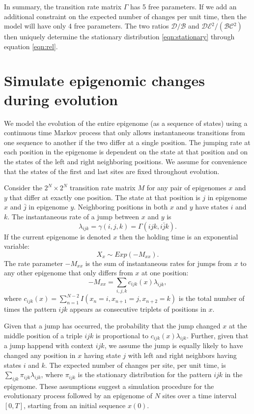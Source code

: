 \documentclass[11pt]{article}
\newcommand{\birth}{\ensuremath{\mathcal{B}}}
\newcommand{\death}{\ensuremath{\mathcal{D}}}
\newcommand{\expansion}{\ensuremath{\mathcal{E}}}
\newcommand{\contraction}{\ensuremath{\mathcal{C}}}
\begin{document}
In summary, the transition rate matrix $\Gamma$ has 5 free
parameters. If we add an additional constraint on the expected number
of changes per unit time, then the model will have only 4 free
parameters. The two ratios $\death{}/\birth{}$ and
$\death{}\expansion{}^2/(\birth{}\contraction{}^2)$ then uniquely
determine the stationary distribution \eqref{eqn:stationary} through
equation \eqref{eqn:rel}.

\section{Simulate epigenomic changes during evolution}


We model the evolution of the entire epigenome (as a sequence of
states) using a continuous time Markov process that only allows
instantaneous transitions from one sequence to another if the two
differ at a single position. The jumping rate at each position in the
epigenome is dependent on the state at that position and on the states
of the left and right neighboring positions. We assume for convenience
that the states of the first and last sites are fixed throughout
evolution.

Consider the $2^N \times 2^N$ transition rate matrix $M$ for any pair
of epigenomes $x$ and $y$ that differ at exactly one position. The
state at that position is $j$ in epigenome $x$ and $\bar{j}$ in
epigenome $y$. Neighboring positions in both $x$ and $y$ have states
$i$ and $k$. The instantaneous rate of a jump between $x$ and $y$
is
\[
\lambda_{ijk} = \gamma(i, j, k) = \Gamma(ijk, i\bar{j}k).
\]
If the current epigenome is denoted $x$ then the holding time
is an exponential variable:
\[
X_x\sim \mathit{Exp}(-M_{xx}).
\]
The rate parameter $-M_{xx}$ is the sum of instantaneous rates for
jumps from $x$ to any other epigenome that only differs from $x$ at
one position:
\[
-M_{xx} =  \sum\limits_{i,j,k}c_{ijk}(x)\lambda_{ijk},
\]
where $c_{ijk}(x) = \sum_{n=1}^{N-2}I(x_{n}=i, x_{n+1}=j, x_{n+2}=k)$
is the total number of times the pattern $ijk$ appears as consecutive
triplets of positions in $x$.

Given that a jump has occurred, the probability that the jump changed
$x$ at the middle position of a triple $ijk$ is proportional to
$c_{ijk}(x)\lambda_{ijk}$. Further, given that a jump happend with
context $ijk$, we assume the jump is equally likely to have changed
any position in $x$ having state $j$ with left and right neighbors
having states $i$ and $k$.
The expected number of changes per site, per unit time, is
$\sum_{ijk}\pi_{ijk}\lambda_{ijk}$, where $\pi_{ijk}$ is the
stationary distribution for the pattern $ijk$ in the epigenome.
These assumptions suggest a simulation procedure for the evolutionary
process followed by an epigenome of $N$ sites over a time interval
$[0, T]$, starting from an initial sequence $x(0)$.
\end{document}
